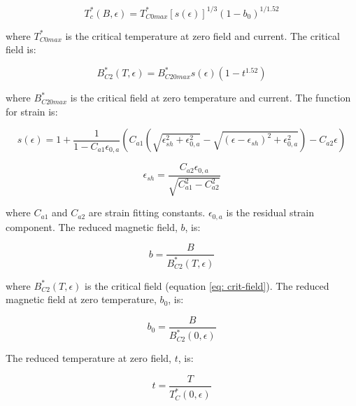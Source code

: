 \documentclass[hidelinks]{article}
\numberwithin{equation}{section}
\begin{document}
    \begin{equation}\label{eq: crit-temp}
        T_c^*(B, \epsilon) = T^*_{C0max}[s(\epsilon)]^{1/3}(1-b_0)^{1/1.52}
    \end{equation}

    \noi where $T^*_{C0max}$ is the critical temperature at zero field and current. 
    The critical field is:

    \begin{equation}\label{eq: crit-field}
        B^*_{C2}(T, \epsilon) = B^*_{C20max}s(\epsilon)(1-t^{1.52})
    \end{equation}

    \noi where $B^*_{C20max}$ is the critical field at zero temperature and current. 
    The function for strain is:

    \begin{equation}\label{eq: strain-func}
        s(\epsilon) = 1 + \frac{1}{1 - C_{a1}\epsilon_{0,a}} \left ( C_{a1} 
        \left ( \sqrt{\epsilon^2_{sh} + \epsilon^2_{0,a}} - 
        \sqrt{(\epsilon - \epsilon_{sh})^2 + \epsilon^2_{0,a}} \right ) - 
        C_{a2}\epsilon \right )
    \end{equation}

    \begin{equation}\label{eq:strain-func-two}
        \epsilon_{sh} = \frac{C_{a2}\epsilon_{0,a}}{\sqrt{C_{a1}^2 - C_{a2}^2}}
    \end{equation}

    \noi where $C_{a1}$ and $C_{a2}$ are strain fitting constants. $\epsilon_{0,a}$ is 
    the residual strain component. The reduced magnetic field, $b$, is:

    \begin{equation}\label{eq: red-mag-field}
        b = \frac{B}{B^*_{C2}(T,\epsilon)}
    \end{equation}

    \noi where $B^*_{C2}(T,\epsilon)$ is the critical field (equation \ref{eq: crit-field}). 
    The reduced magnetic field at zero temperature, $b_0$, is:

    \begin{equation}\label{eq: red-mag-field-tzero}
          b_0 = \frac{B}{B^*_{C2}(0,\epsilon)}
    \end{equation}

    \noindent The reduced temperature at zero field, $t$, is:

    \begin{equation}\label{eq: red-temp-bzero}
        t = \frac{T}{T^*_{C}(0,\epsilon)}
    \end{equation}
\end{document}
